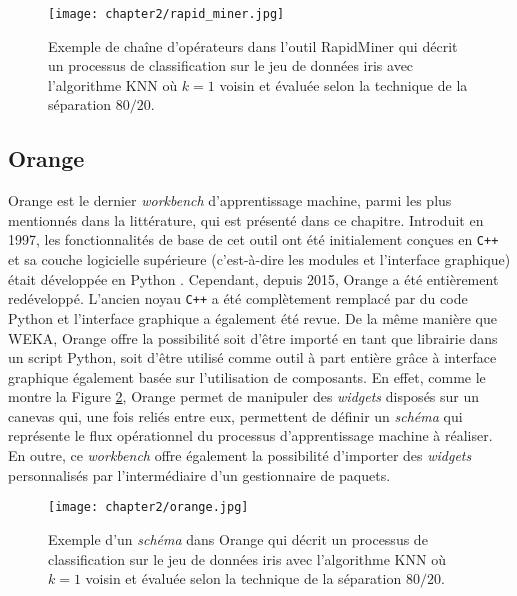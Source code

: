 \begin{figure}[H]
	\centering
	\texttt{[image: chapter2/rapid\_miner.jpg]}
        \caption{Exemple de chaîne d'opérateurs dans l'outil RapidMiner qui décrit un processus de classification sur le jeu de données iris avec l'algorithme \acs{KNN} où $k=1$ voisin et évaluée selon la technique de la séparation $80/20$.}
	\label{fig:rapid_miner}
\end{figure}

\subsection{Orange}

Orange est le dernier \textit{workbench} d'apprentissage machine, parmi les plus mentionnés dans la littérature, qui est présenté dans ce chapitre. Introduit en 1997, les fonctionnalités de base de cet outil ont été initialement conçues en \verb!C++! et sa couche logicielle supérieure (c'est-à-dire les modules et l'interface graphique) était développée en Python \citep{Demsar2004,Demsar2013}. Cependant, depuis 2015, Orange a été entièrement redéveloppé. L'ancien noyau \verb!C++! a été complètement remplacé par du code Python et l'interface graphique a également été revue. De la même manière que \acs{WEKA}, Orange offre la possibilité soit d'être importé en tant que librairie dans un script Python, soit d'être utilisé comme outil à part entière grâce à interface graphique également basée sur l'utilisation de composants. En effet, comme le montre la Figure \ref{fig:orange}, Orange permet de manipuler des \emph{widgets} disposés sur un canevas qui, une fois reliés entre eux, permettent de définir un \emph{schéma} qui représente le flux opérationnel du processus d'apprentissage machine à réaliser. En outre, ce \textit{workbench} offre également la possibilité d'importer des \emph{widgets} personnalisés par l'intermédiaire d'un gestionnaire de paquets.

\begin{figure}[H]
	\centering
	\texttt{[image: chapter2/orange.jpg]}
        \caption{Exemple d'un \emph{schéma} dans Orange qui décrit un processus de classification sur le jeu de données iris avec l'algorithme \acs{KNN} où $k=1$ voisin et évaluée selon la technique de la séparation $80/20$.}
	\label{fig:orange}
\end{figure}

